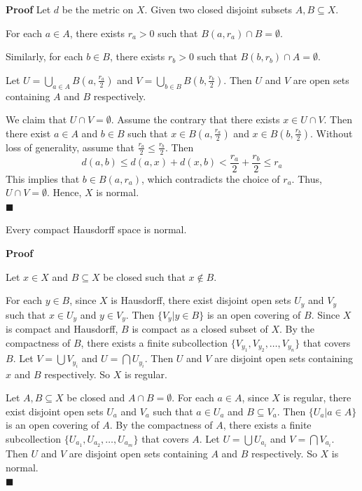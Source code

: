 \documentclass[main.tex]{subfiles}
\begin{document}
\par \noindent \textbf{Proof} Let $d$ be the metric on $X$. Given two closed disjoint subsets $A, B \subseteq X$. 
\par For each $a\in A$, there exists $r_a > 0$ such that $B(a, r_a) \cap B = \emptyset$. 
\par Similarly, for each $b \in B$, there exists $r_b > 0$ such that $B(b, r_b) \cap A = \emptyset$.
\par Let $U = \bigcup_{a \in A} B(a, \frac{r_a}{2})$ and $V = \bigcup_{b \in B} B(b, \frac{r_b}{2})$. Then $U$ and $V$ are open sets containing $A$ and $B$ respectively. 
\par We claim that $U \cap V = \emptyset$. Assume the contrary that there exists $x \in U \cap V$. Then there exist $a \in A$ and $b \in B$ such that $x \in B(a, \frac{r_a}{2})$ and $x \in B(b, \frac{r_b}{2})$. Without loss of generality, assume that $\frac{r_a}{2} \leq \frac{r_b}{2}$. Then
\begin{equation}
    d(a, b) \leq d(a, x) + d(x, b) < \frac{r_a}{2} + \frac{r_b}{2} \leq r_a
\end{equation}
This implies that $b \in B(a, r_a)$, which contradicts the choice of $r_a$. Thus, $U \cap V = \emptyset$. Hence, $X$ is normal. 
\mbox{} \\ \null \hfill $\blacksquare$ 
\begin{theorem}
    Every compact Hausdorff space is normal.
\end{theorem}
\par \noindent \textbf{Proof} 
\par Let $x\in X$ and $B \subseteq X$ be closed such that $x \notin B$.
\par For each $y\in B$, since $X$ is Hausdorff, there exist disjoint open sets $U_y$ and $V_y$ such that $x \in U_y$ and $y \in V_y$. Then $\{V_y | y \in B\}$ is an open covering of $B$. Since $X$ is compact and Hausdorff, $B$ is compact as a closed subset of $X$. By the compactness of $B$, there exists a finite subcollection $\{V_{y_1}, V_{y_2}, \ldots, V_{y_n}\}$ that covers $B$. 
Let $V = \bigcup V_{y_i}$ and $U = \bigcap U_{y_i}$. Then $U$ and $V$ are disjoint open sets containing $x$ and $B$ respectively. So $X$ is regular. 
\par Let $A, B \subseteq X$ be closed and $A \cap B = \emptyset$. For each $a\in A$, since $X$ is regular, there exist disjoint open sets $U_a$ and $V_a$ such that $a \in U_a$ and $B \subseteq V_a$. Then $\{U_a | a \in A\}$ is an open covering of $A$. By the compactness of $A$, there exists a finite subcollection $\{U_{a_1}, U_{a_2}, \ldots, U_{a_m}\}$ that covers $A$. 
Let $U = \bigcup U_{a_i}$ and $V = \bigcap V_{a_i}$. Then $U$ and $V$ are disjoint open sets containing $A$ and $B$ respectively. So $X$ is normal. 
\mbox{} \\ \null \hfill $\blacksquare$ 
\end{document}
